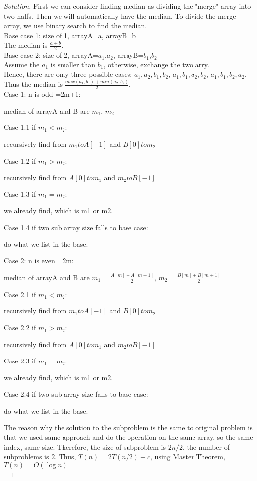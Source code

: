 \documentclass[12pt]{article}
\begin{document}
\begin{proof}[Solution]
	First we can consider finding median as dividing the "merge" array into two halfs. Then we will automatically have the median. To divide the merge array, we use binary search to find the median. \\
	
	Base case 1: size of 1, arrayA={a}, arrayB={b}\\
	The median is $\frac{a+b}{2}$.\\
	
	Base case 2: size of 2, arrayA={$a_1$,$a_2$}, arrayB={$b_1$,$b_2$}\\
	Assume the $a_1$ is smaller than $b_1$, otherwise, exchange the two arry.\\
	Hence, there are only three possible cases: ${a_1,a_2,b_1,b_2}$, ${a_1,b_1,a_2,b_2}$, ${a_1,b_1,b_2,a_2}$. Thus the median is $\frac{max(a_1,b_1)+min(a_2,b_2)}{2}$.\\
	
	Case 1: n is odd =2m+1:
	
	\quad median of arrayA and B are $m_1$, $m_2$
	
	\quad Case 1.1 if $m_1<m_2$:
	
	\qquad recursively find from $m_1 to A[-1]$ and $B[0] to m_2$
	
	\quad Case 1.2 if $m_1>m_2$:
	
	\qquad recursively find from $A[0] to m_1$ and $m_2 to B[-1]$
	
	\quad Case 1.3 if $m_1=m_2$:
	
	\qquad we already find, which is m1 or m2.
	
	\quad Case 1.4 if two sub array size falls to base case:
	
	\qquad do what we list in the base.
	
	Case 2: n is even =2m:
	
	\quad median of arrayA and B are $m_1=\frac{A[m]+A[m+1]}{2}$, $m_2=\frac{B[m]+B[m+1]}{2}$
	
	\quad Case 2.1 if $m_1<m_2$:
	
	\qquad recursively find from $m_1 to A[-1]$ and $B[0] to m_2$
	
	\quad Case 2.2 if $m_1>m_2$:
	
	\qquad recursively find from $A[0] to m_1$ and $m_2 to B[-1]$
	
	\quad Case 2.3 if $m_1=m_2$:
	
	\qquad we already find, which is m1 or m2.
	
	\quad Case 2.4 if two sub array size falls to base case:
	
	\qquad do what we list in the base.
	
	The reason why the solution to the subproblem is the same to original problem is that we used same approach and do the operation on the same array, so the same index, same size. Therefore, the size of subproblem is $2n/2$, the number of subproblems is $2$. Thus, $T(n) = 2T(n/2) + c$, using Master Theorem, $T(n) = O(\log n)$ \\


	
\end{proof}
\end{document}
